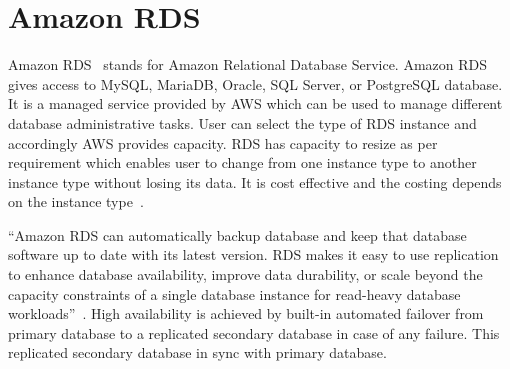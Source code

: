 \section{Amazon RDS}

Amazon RDS~\cite{hid-sp18-420-amazon-RDS} stands for Amazon Relational Database
Service. Amazon RDS gives access to MySQL, MariaDB, Oracle, SQL Server, or
PostgreSQL database. It is a managed service provided by AWS which can be used
to manage different database administrative tasks. User can select the type of
RDS instance and accordingly AWS provides capacity. RDS has capacity to resize
as per requirement which enables user to change from one instance type to
another instance type without losing its data. It is cost effective and the
costing depends on the instance type~\cite{hid-sp18-420-amazon-RDS-FAQ}.

``Amazon RDS can automatically backup database and keep that database software
up to date with its latest version. RDS makes it easy to use replication to
enhance database availability, improve data durability, or scale beyond the
capacity constraints of a single database instance for read-heavy database
workloads''~\cite{hid-sp18-420-amazon-RDS-FAQ}. High availability is achieved by
built-in automated failover from primary database to a replicated secondary
database in case of any failure. This replicated secondary database in sync with
primary database.
